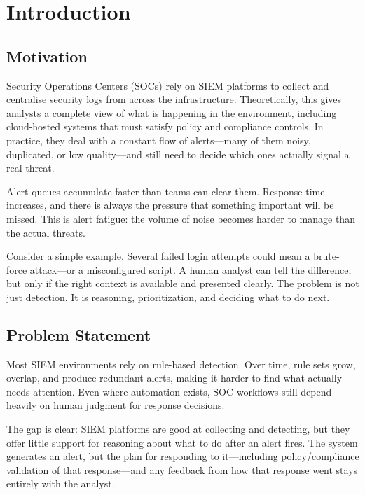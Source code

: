 \chapter{Introduction}
\label{chap:introduction}


\section{Motivation}

Security Operations Centers (SOCs) rely on SIEM platforms to collect and centralise security logs from across the infrastructure. \cite{nist80092} Theoretically, this gives analysts a complete view of what is happening in the environment, including cloud-hosted systems that must satisfy policy and compliance controls. In practice, they deal with a constant flow of alerts---many of them noisy, duplicated, or low quality---and still need to decide which ones actually signal a real threat. \cite{ban2023alertfatigue}

Alert queues accumulate faster than teams can clear them. Response time increases, and there is always the pressure that something important will be missed. This is alert fatigue: the volume of noise becomes harder to manage than the actual threats. \cite{tilbury2024humans}

Consider a simple example. Several failed login attempts could mean a brute-force attack---or a misconfigured script. A human analyst can tell the difference, but only if the right context is available and presented clearly. The problem is not just detection. It is reasoning, prioritization, and deciding what to do next.

\section{Problem Statement}

Most SIEM environments rely on rule-based detection. Over time, rule sets grow, overlap, and produce redundant alerts, making it harder to find what actually needs attention. \cite{rulegenie2025} Even where automation exists, SOC workflows still depend heavily on human judgment for response decisions. \cite{tilbury2024humans}

The gap is clear: SIEM platforms are good at collecting and detecting, but they offer little support for reasoning about what to do after an alert fires. \cite{ban2023alertfatigue} The system generates an alert, but the plan for responding to it---including policy/compliance validation of that response---and any feedback from how that response went stays entirely with the analyst.


